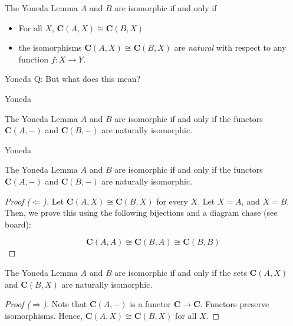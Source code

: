\documentclass[tikz]{beamer}
\theoremstyle{definition}
\begin{document}
\begin{frame}
\begin{block}{The Yoneda Lemma}
    $A$ and $B$ are isomorphic if and only if
    \begin{itemize}
        \item For all $X$, $\mathbf{C}(A, X) \cong \mathbf{C}(B, X)$

        \item the isomorphisms $\mathbf{C}(A, X) \cong \mathbf{C}(B, X)$ are \textit{natural} with respect to any function $f : X \to Y$.
    \end{itemize}{}
\end{block}{}



\end{frame}
\begin{frame}{Yoneda}
    Q: But what does this mean?

\end{frame}
\begin{frame}{Yoneda}
    \begin{block}{The Yoneda Lemma}
        $A$ and $B$ are isomorphic if and only if the functors $\mathbf{C}(A, -) $ and $\mathbf{C}(B, -)$ are naturally isomorphic.
    \end{block}{}
\end{frame}

\begin{frame}{Yoneda}
    \begin{block}{The Yoneda Lemma}
        $A$ and $B$ are isomorphic if and only if the functors $\mathbf{C}(A, -) $ and $\mathbf{C}(B, -)$ are naturally isomorphic.
    \end{block}{}

    \begin{proof}[Proof ($\Leftarrow$)]

        Let $\mathbf{C}(A, X) \cong \mathbf{C}(B, X)$ for every $X$. Let $X = A$, and $X = B$. Then, we prove this using the following bijections and a diagram chase (see board):

        \begin{equation*}
            \mathbf{C}(A, A) \cong \mathbf{C}(B, A) \cong \mathbf{C}(B, B)
        \end{equation*}{}
    \end{proof}
\end{frame}

\begin{frame}[fragile]
    \begin{block}{The Yoneda Lemma}
        $A$ and $B$ are isomorphic if and only if the sets $\mathbf{C}(A, X) $ and $\mathbf{C}(B, X)$ are naturally isomorphic.
    \end{block}{}

    \begin{proof}[Proof ($\Rightarrow$)]

        Note that $\mathbf{C}(A,-)$ is a functor $\mathbf{C} \to \mathbf{C}$. Functors preserve isomorphisms. Hence, $\mathbf{C}(A, X) \cong \mathbf{C}(B, X)$ for all $X$.

    \end{proof}
\end{frame}
\end{document}

